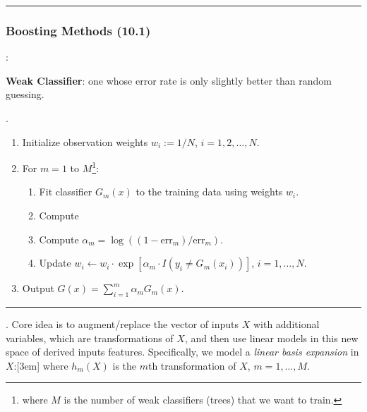 \documentclass[12pt]{article}
\newcommand{\myspace}{\vspace{2\bigskipamount}}
\newcommand\p{\Needspace{10\baselineskip} \noindent}
\begin{document}

\myspace
\hrule
\subsubsection{Boosting Methods (10.1)}

\p {}:
\begin{compactitem}
	\item \textbf{Weak Classifier}: one whose error rate is only slightly better than random guessing.
\end{compactitem}

\p {}. 

\begin{enumerate}
	\item Initialize observation weights $w_i := 1/N$, $i = 1, 2, \ldots, N$. 
	
	\item For $m = 1$ to $M$\footnote{where $M$ is the number of weak classifiers (trees) that we want to train.}:
	\begin{enumerate}
		\item Fit classifier $G_m(x)$ to the training data using weights $w_i$. 
		\item Compute
		\item Compute $\alpha_m = \log\left( (1 - \text{err}_m)/\text{err}_m \right)$.
		\item Update $w_i \leftarrow w_i \cdot \exp[ \alpha_m \cdot I(y_i \ne G_m(x_i)) ]$, $i = 1, \ldots, N$.
	\end{enumerate}
	
	\item Output $G(x) = \sum_{i = 1}^{m} \alpha_m G_m(x)$. 
\end{enumerate}
\hrule



\p {}. Core idea is to augment/replace the vector of inputs $X$ with additional variables, which are transformations of $X$, and then use linear models in this new space of derived inputs features. Specifically, we model a \textit{linear basis expansion} in $X$:[3em]
where $h_m(X)$ is the $m$th transformation of $X$, $m = 1,\ldots,M$. 
\end{document}
